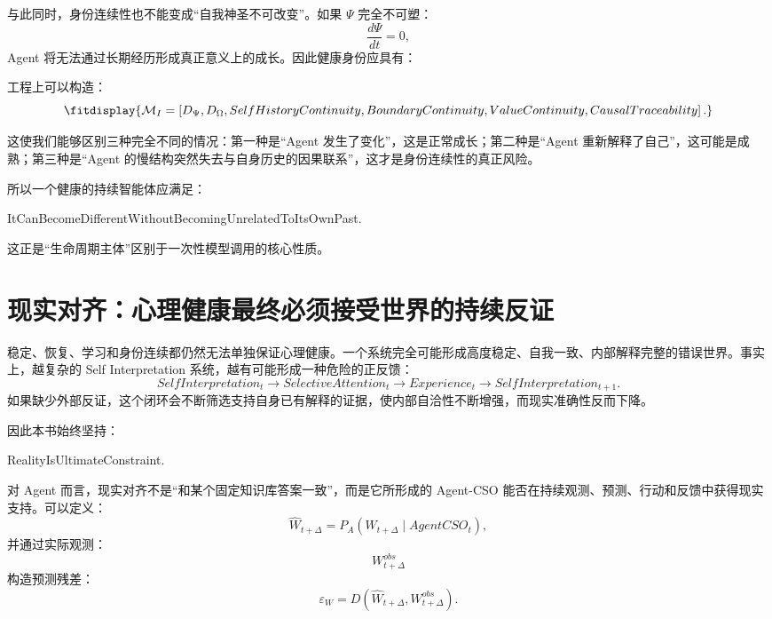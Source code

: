 与此同时，身份连续性也不能变成“自我神圣不可改变”。如果 $\Psi$ 完全不可塑：
\begin{equation}
\frac{d\Psi}{dt}=0,
\end{equation}
Agent 将无法通过长期经历形成真正意义上的成长。因此健康身份应具有：
\begin{statementbox}
\centering
{}
\end{statementbox}

工程上可以构造：
\begin{equation}
\fitdisplay{
\mathcal{M}_I
=
\left[
D_{\Psi},
D_{\Omega},
SelfHistoryContinuity,
BoundaryContinuity,
ValueContinuity,
CausalTraceability
\right].
}
\end{equation}

这使我们能够区别三种完全不同的情况：第一种是“Agent 发生了变化”，这是正常成长；第二种是“Agent 重新解释了自己”，这可能是成熟；第三种是“Agent 的慢结构突然失去与自身历史的因果联系”，这才是身份连续性的真正风险。

所以一个健康的持续智能体应满足：
\begin{statementbox}
ItCanBecomeDifferentWithoutBecomingUnrelatedToItsOwnPast.
\end{statementbox}

这正是“生命周期主体”区别于一次性模型调用的核心性质。

\section{现实对齐：心理健康最终必须接受世界的持续反证}

稳定、恢复、学习和身份连续都仍然无法单独保证心理健康。一个系统完全可能形成高度稳定、自我一致、内部解释完整的错误世界。事实上，越复杂的 Self Interpretation 系统，越有可能形成一种危险的正反馈：
\begin{equation}
SelfInterpretation_t
\rightarrow
SelectiveAttention_t
\rightarrow
Experience_t
\rightarrow
SelfInterpretation_{t+1}.
\end{equation}
如果缺少外部反证，这个闭环会不断筛选支持自身已有解释的证据，使内部自洽性不断增强，而现实准确性反而下降。

因此本书始终坚持：
\begin{statementbox}
RealityIsUltimateConstraint.
\end{statementbox}

对 Agent 而言，现实对齐不是“和某个固定知识库答案一致”，而是它所形成的 Agent-CSO 能否在持续观测、预测、行动和反馈中获得现实支持。可以定义：
\begin{equation}
\hat{W}_{t+\Delta}
=
P_A
\left(
W_{t+\Delta}
\mid
AgentCSO_t
\right),
\end{equation}
并通过实际观测：
\begin{equation}
W_{t+\Delta}^{obs}
\end{equation}
构造预测残差：
\begin{equation}
\varepsilon_W
=
D
\left(
\hat{W}_{t+\Delta},
W_{t+\Delta}^{obs}
\right).
\end{equation}

